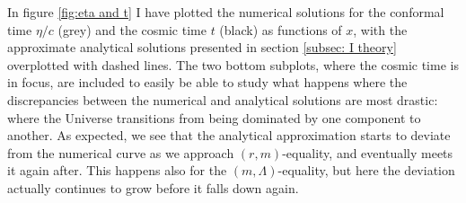 \documentclass{aa}
\numberwithin{equation}{section}
\numberwithin{table}{section}
\numberwithin{figure}{section}
\begin{document}
In figure \ref{fig:eta and t} I have plotted the numerical solutions for the conformal time $\eta/c$ (grey) and the cosmic time $t$ (black) as functions of $x$, with the approximate analytical solutions presented in section \ref{subsec: I theory} overplotted with dashed lines. The two bottom subplots, where the cosmic time is in focus, are included to easily be able to study what happens where the discrepancies between the numerical and analytical solutions are most drastic: where the Universe transitions from being dominated by one component to another. As expected, we see that the analytical approximation starts to deviate from the numerical curve as we approach $(r,m)$-equality, and eventually meets it again after. This happens also for the $(m,\Lambda)$-equality, but here the deviation actually continues to grow before it falls down again.
\end{document}
